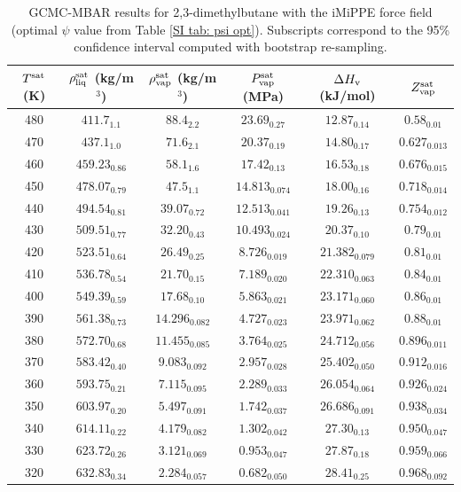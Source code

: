 \documentclass[journal=jctc,manuscript=article]{achemso}
\begin{document}
\begin{table}[htb!]
	\caption{GCMC-MBAR results for 2,3-dimethylbutane with the iMiPPE force field (optimal $\psi$ value from Table \ref{SI tab: psi opt}). Subscripts correspond to the 95\% confidence interval computed with bootstrap re-sampling.}
	\begin{center}
		\begin{tabular}{|c|c|c|c|c|c|}
			\hline
			$T^{\rm sat}$ (K) & $\rho_{\rm liq}^{\rm sat}$ (kg/m$^3$) & $\rho_{\rm vap}^{\rm sat}$ (kg/m$^3$) & $P_{\rm vap}^{\rm sat}$ (MPa) & $\Delta H_{\rm v}$ (kJ/mol) & $Z_{\rm vap}^{\rm sat}$ \\ \hline
			480 & $411.7_{1.1}$ & $88.4_{2.2}$ & $23.69_{0.27}$ & $12.87_{0.14}$ & $0.58_{0.01}$ \\
			470 & $437.1_{1.0}$ & $71.6_{2.1}$ & $20.37_{0.19}$ & $14.80_{0.17}$ & $0.627_{0.013}$ \\
			460 & $459.23_{0.86}$ & $58.1_{1.6}$ & $17.42_{0.13}$ & $16.53_{0.18}$ & $0.676_{0.015}$ \\
			450 & $478.07_{0.79}$ & $47.5_{1.1}$ & $14.813_{0.074}$ & $18.00_{0.16}$ & $0.718_{0.014}$ \\
			440 & $494.54_{0.81}$ & $39.07_{0.72}$ & $12.513_{0.041}$ & $19.26_{0.13}$ & $0.754_{0.012}$ \\
			430 & $509.51_{0.77}$ & $32.20_{0.43}$ & $10.493_{0.024}$ & $20.37_{0.10}$ & $0.79_{0.01}$ \\
			420 & $523.51_{0.64}$ & $26.49_{0.25}$ & $8.726_{0.019}$ & $21.382_{0.079}$ & $0.81_{0.01}$ \\
			410 & $536.78_{0.54}$ & $21.70_{0.15}$ & $7.189_{0.020}$ & $22.310_{0.063}$ & $0.84_{0.01}$ \\
			400 & $549.39_{0.59}$ & $17.68_{0.10}$ & $5.863_{0.021}$ & $23.171_{0.060}$ & $0.86_{0.01}$ \\
			390 & $561.38_{0.73}$ & $14.296_{0.082}$ & $4.727_{0.023}$ & $23.971_{0.062}$ & $0.88_{0.01}$ \\
			380 & $572.70_{0.68}$ & $11.455_{0.085}$ & $3.764_{0.025}$ & $24.712_{0.056}$ & $0.896_{0.011}$ \\
			370 & $583.42_{0.40}$ & $9.083_{0.092}$ & $2.957_{0.028}$ & $25.402_{0.050}$ & $0.912_{0.016}$ \\
			360 & $593.75_{0.21}$ & $7.115_{0.095}$ & $2.289_{0.033}$ & $26.054_{0.064}$ & $0.926_{0.024}$ \\
			350 & $603.97_{0.20}$ & $5.497_{0.091}$ & $1.742_{0.037}$ & $26.686_{0.091}$ & $0.938_{0.034}$ \\
			340 & $614.11_{0.22}$ & $4.179_{0.082}$ & $1.302_{0.042}$ & $27.30_{0.13}$ & $0.950_{0.047}$ \\
			330 & $623.72_{0.26}$ & $3.121_{0.069}$ & $0.953_{0.047}$ & $27.87_{0.18}$ & $0.959_{0.066}$ \\
			320 & $632.83_{0.34}$ & $2.284_{0.057}$ & $0.682_{0.050}$ & $28.41_{0.25}$ & $0.968_{0.092}$ \\
			\hline
		\end{tabular}
	\end{center}
\end{table}
\end{document}

